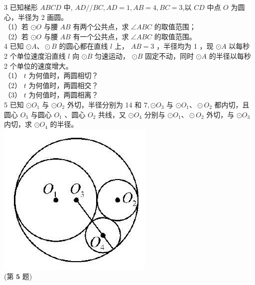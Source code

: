 \documentclass[10pt]{article}
\begin{document}
3 已知梯形 $A B C D$ 中, $A D / / B C, A D=1, A B=4, B C=3$,以 $C D$ 中点 $O$ 为圆心，半径为 2 画圆。\\
（1）若 $\odot O$ 与腰 $A B$ 有两个公共点，求 $\angle A B C$ 的取值范围；\\
（2）若 $\odot O$ 与腰 $A B$ 有一个公共点，求 $\angle A B C$ 的取值范围。\\
4 已知 $\odot A 、 \odot B$ 的圆心都在直线 $l$ 上， $A B=3$ ，半径均为 1 ，现 $\odot A$ 以每秒 2 个单位速度沿直线 $l$ 向 $\odot B$ 匀速运动， $\odot B$ 固定不动，同时 $\odot A$ 的半径以每秒 2 个单位的速度增大。\\
（1） $t$ 为何值时，两圆相切？\\
（2） $t$ 为何值时，两圆相交？\\
（3） $t$ 为何值时，两圆相离？\\
5 已知 $\odot O_{1}$ 与 $\odot O_{2}$ 外切，半径分别为 14 和 $7, \odot O_{3}$ 与 $\odot O_{1} 、 \odot O_{2}$ 都内切，且圆心 $O_{3}$ 与圆心 $O_{1}$ 、圆心 $O_{2}$ 共线，又 $\odot O_{4}$ 分别与 $\odot O_{1} 、 \odot O_{2}$ 外切，与 $\odot O_{3}$ 内切，求 $\odot O_{4}$ 的半径。\\
\includegraphics[max width=\textwidth, center]{2024_10_30_66b8e5e701da2093c133g-033}\\
(第 $\mathbf{5}$ 题)
\end{document}
